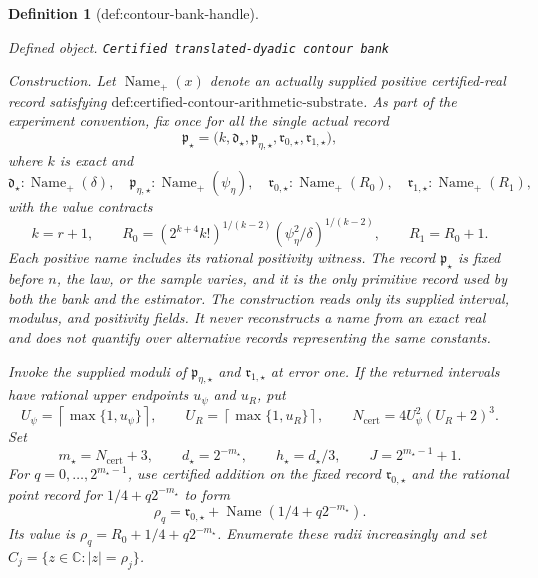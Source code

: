 \documentclass{article}
\newtheorem{definition}{Definition}
\begin{document}
\begin{definition}[def:contour-bank-handle]\label{def:contour-bank-handle}
\par\smallskip\noindent\emph{Defined object.} \texttt{Certified translated-\allowbreak{}dyadic contour bank}
\par\smallskip\noindent\emph{Construction.} Let \(\operatorname{Name}_{+}(x)\) denote an actually supplied positive certified-real record satisfying \(\text{def:certified-contour-arithmetic-substrate}\).  As part of the experiment convention, fix once for all the single actual record
\[
 \mathfrak p_{\star}=
 \bigl(k,\mathfrak d_{\star},\mathfrak p_{\eta,\star},
       \mathfrak r_{0,\star},\mathfrak r_{1,\star}\bigr),
\]
where \(k\) is exact and
\[
 \mathfrak d_{\star}:\operatorname{Name}_{+}(\delta),\quad
 \mathfrak p_{\eta,\star}:\operatorname{Name}_{+}(\psi_{\eta}),\quad
 \mathfrak r_{0,\star}:\operatorname{Name}_{+}(R_0),\quad
 \mathfrak r_{1,\star}:\operatorname{Name}_{+}(R_1),
\]
with the value contracts
\[
 k=r+1,\qquad
 R_0=(2^{k+4}k!)^{1/(k-2)}
       (\psi_{\eta}^2/\delta)^{1/(k-2)},
 \qquad R_1=R_0+1.
\]
Each positive name includes its rational positivity witness.  The record \(\mathfrak p_{\star}\) is fixed before \(n\), the law, or the sample varies, and it is the only primitive record used by both the bank and the estimator.  The construction reads only its supplied interval, modulus, and positivity fields.  It never reconstructs a name from an exact real and does not quantify over alternative records representing the same constants.

Invoke the supplied moduli of \(\mathfrak p_{\eta,\star}\) and \(\mathfrak r_{1,\star}\) at error one.  If the returned intervals have rational upper endpoints \(u_{\psi}\) and \(u_R\), put
\[
 U_{\psi}=\left\lceil\max\{1,u_{\psi}\}\right\rceil,
 \qquad
 U_R=\left\lceil\max\{1,u_R\}\right\rceil,
 \qquad
 N_{\mathrm{cert}}=4U_{\psi}^2(U_R+2)^3.
\]
Set
\[
 m_{\star}=N_{\mathrm{cert}}+3,
 \qquad d_{\star}=2^{-m_{\star}},
 \qquad h_{\star}=d_{\star}/3,
 \qquad J=2^{m_{\star}-1}+1.
\]
For \(q=0,\ldots,2^{m_{\star}-1}\), use certified addition on the fixed record \(\mathfrak r_{0,\star}\) and the rational point record for \(1/4+q2^{-m_{\star}}\) to form
\[
 \mathfrak\rho_q
 =\mathfrak r_{0,\star}+\operatorname{Name}(1/4+q2^{-m_{\star}}).
\]
Its value is \(\rho_q=R_0+1/4+q2^{-m_{\star}}\).  Enumerate these radii increasingly and set \(C_j=\{z\in\mathbb C:|z|=\rho_j\}\).


\end{definition}
\end{document}
